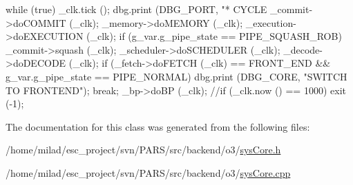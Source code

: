 \begin{DoxyCode}
                          {
        while (true) {
                _clk.tick ();
        dbg.print (DBG_PORT, "\n** CYCLE %
            _commit->doCOMMIT (_clk);
            _memory->doMEMORY (_clk);
            _execution->doEXECUTION (_clk);
        if (g_var.g_pipe_state == PIPE_SQUASH_ROB) _commit->squash (_clk);
            _scheduler->doSCHEDULER (_clk);
            _decode->doDECODE (_clk);
            if (_fetch->doFETCH (_clk) == FRONT_END && g_var.g_pipe_state == 
      PIPE_NORMAL) {
            dbg.print (DBG_CORE, "SWITCH TO FRONTEND\n");
            break;
        }
        _bp->doBP (_clk);
        //if (_clk.now () == 1000) exit (-1);
        }
}
\end{DoxyCode}


The documentation for this class was generated from the following files:\begin{DoxyCompactItemize}
\item 
/home/milad/esc\_\-project/svn/PARS/src/backend/o3/\hyperlink{o3_2sysCore_8h}{sysCore.h}\item 
/home/milad/esc\_\-project/svn/PARS/src/backend/o3/\hyperlink{o3_2sysCore_8cpp}{sysCore.cpp}\end{DoxyCompactItemize}
